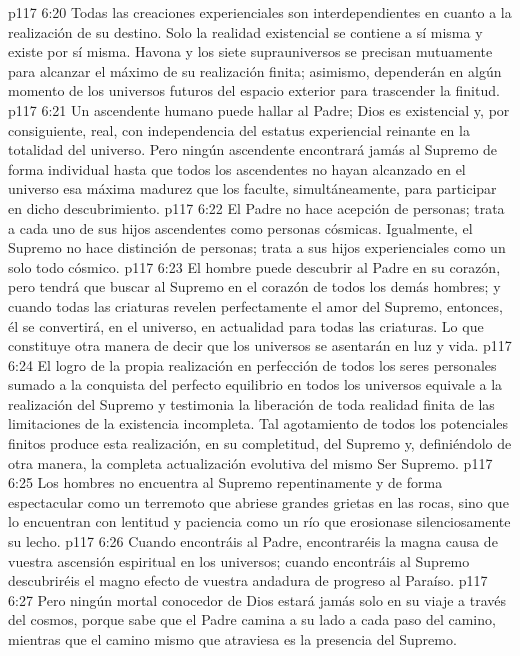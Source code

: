 \vs p117 6:20 Todas las creaciones experienciales son interdependientes en cuanto a la realización de su destino. Solo la realidad existencial se contiene a sí misma y existe por sí misma. Havona y los siete suprauniversos se precisan mutuamente para alcanzar el máximo de su realización finita; asimismo, dependerán en algún momento de los universos futuros del espacio exterior para trascender la finitud.
\vs p117 6:21 Un ascendente humano puede hallar al Padre; Dios es existencial y, por consiguiente, real, con independencia del estatus experiencial reinante en la totalidad del universo. Pero ningún ascendente encontrará jamás al Supremo de forma individual hasta que todos los ascendentes no hayan alcanzado en el universo esa máxima madurez que los faculte, simultáneamente, para participar en dicho descubrimiento.
\vs p117 6:22 El Padre no hace acepción de personas; trata a cada uno de sus hijos ascendentes como personas cósmicas. Igualmente, el Supremo no hace distinción de personas; trata a sus hijos experienciales como un solo todo cósmico.
\vs p117 6:23 El hombre puede descubrir al Padre en su corazón, pero tendrá que buscar al Supremo en el corazón de todos los demás hombres; y cuando todas las criaturas revelen perfectamente el amor del Supremo, entonces, él se convertirá, en el universo, en actualidad para todas las criaturas. Lo que constituye otra manera de decir que los universos se asentarán en luz y vida.
\vs p117 6:24 El logro de la propia realización en perfección de todos los seres personales sumado a la conquista del perfecto equilibrio en todos los universos equivale a la realización del Supremo y testimonia la liberación de toda realidad finita de las limitaciones de la existencia incompleta. Tal agotamiento de todos los potenciales finitos produce esta realización, en su completitud, del Supremo y, definiéndolo de otra manera, la completa actualización evolutiva del mismo Ser Supremo.
\vs p117 6:25 \pc Los hombres no encuentra al Supremo repentinamente y de forma espectacular como un terremoto que abriese grandes grietas en las rocas, sino que lo encuentran con lentitud y paciencia como un río que erosionase silenciosamente su lecho.
\vs p117 6:26 Cuando encontráis al Padre, encontraréis la magna causa de vuestra ascensión espiritual en los universos; cuando encontráis al Supremo descubriréis el magno efecto de vuestra andadura de progreso al Paraíso.
\vs p117 6:27 Pero ningún mortal conocedor de Dios estará jamás solo en su viaje a través del cosmos, porque sabe que el Padre camina a su lado a cada paso del camino, mientras que el camino mismo que atraviesa es la presencia del Supremo.
